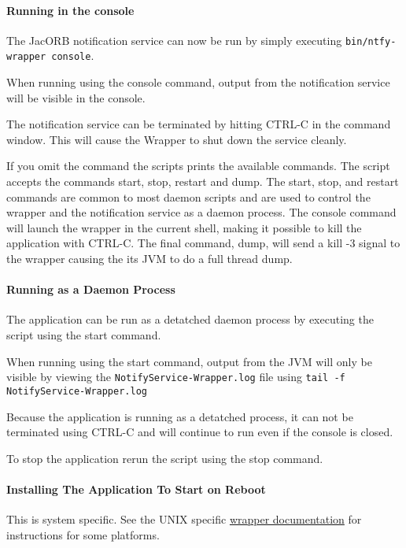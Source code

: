 \paragraph{Running in the console}
\label{sec:running-console}

 The JacORB notification service  can now be run by simply executing
 \texttt{bin/ntfy-wrapper console}.

 When running using the console command, output from the notification
 service will be visible in the console. 

 The notification service can be terminated by hitting CTRL-C in the command
 window. This will cause the Wrapper to shut down the service cleanly.  

 If you omit the command the scripts prints the available commands.
 The script accepts the commands start, stop, restart and dump. The
 start, stop, and restart commands are common to most daemon scripts
 and are used to control the wrapper and the notification service  as
 a daemon process. The console 
 command will launch the wrapper in the current shell, making it
 possible to kill the application with CTRL-C. The final command,
 dump, will send a kill -3 signal to the wrapper causing the its JVM
 to do a full thread dump.  


\paragraph{Running as a Daemon Process}
\label{sec:running-as-daemon}

 The application can be run as a detatched daemon process by executing
 the script using the start  command. 

 When running using the start  command, output from the JVM will only
 be visible by viewing the \texttt{NotifyService-Wrapper.log} file
 using \texttt{tail -f NotifyService-Wrapper.log}

 Because the application is running as a detatched process, it can not
 be terminated using CTRL-C and will continue to run even if the
 console is closed. 

 To stop the application rerun the script using the stop command.

 
 \paragraph{Installing The Application To Start on Reboot}
 \label{sec:inst-appl-start}

 This is system specific. See the UNIX specific
 \href{http://wrapper.tanukisoftware.org/doc/english/launch-nix.html}{wrapper
   documentation} for instructions for some platforms.

